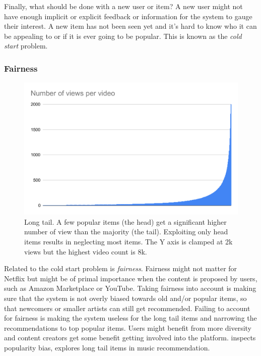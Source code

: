 Finally, what should be done with a new user or item? A new user might not have enough implicit or explicit feedback or information for the system to gauge their interest. A new item has not been seen yet and it's hard to know who it can be appealing to or if it is ever going to be popular. This is known as the \emph{cold start} problem.

\subsubsection{Fairness}

\begin{figure}
    \centering
    \includegraphics[width=\columnwidth]{70-files/long-tail.pdf}
    \caption{Long tail. A few popular items (the head) get a significant higher number of view than the majority (the tail). Exploiting only head items results in neglecting most items. The Y axis is clamped at 2k views but the highest video count is 8k.}
    \label{fig:long-tail}
\end{figure}

Related to the cold start problem is \emph{fairness}. Fairness might not matter for Netflix but might be of primal importance when the content is proposed by users, such as Amazon Marketplace or YouTube. Taking fairness into account is making sure that the system is not overly biased towards old and/or popular items, so that newcomers or smaller artists can still get recommended. Failing to account for fairness is making the system useless for the long tail items and narrowing the recommendations to top popular items. Users might benefit from more diversity and content creators get some benefit getting involved into the platform. \cite{popularitybias} inspects popularity bias, \cite{longtail} explores long tail items in music recommendation.

